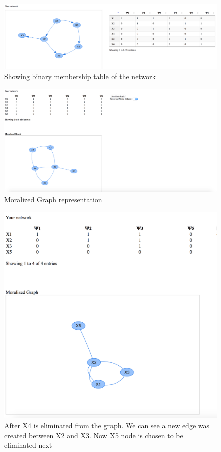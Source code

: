 \documentclass{article}
\begin{document}
\begin{enumerate}
    \begin{figure}[bp]
        \includegraphics[width=\linewidth]{img/network_binary_matrix.png}
        \caption{Showing binary membership table of the network}
        \label{fig:binary_membership}
    \end{figure}

    \begin{figure}[bp]
        \includegraphics[width=\linewidth]{img/moralized_graph.png}
        \caption{Moralized Graph representation}
        \label{fig:moralized_graph}
    \end{figure}

    \begin{figure}[bp]
        \includegraphics[width=\linewidth]{img/after_x4_elimination.png}
        \caption{After X4 is eliminated from the graph. We can see a new edge was created between X2 and X3. Now X5 node is chosen to be eliminated next}
        \label{fig:elimination}
    \end{figure}


\end{enumerate}
\end{document}
